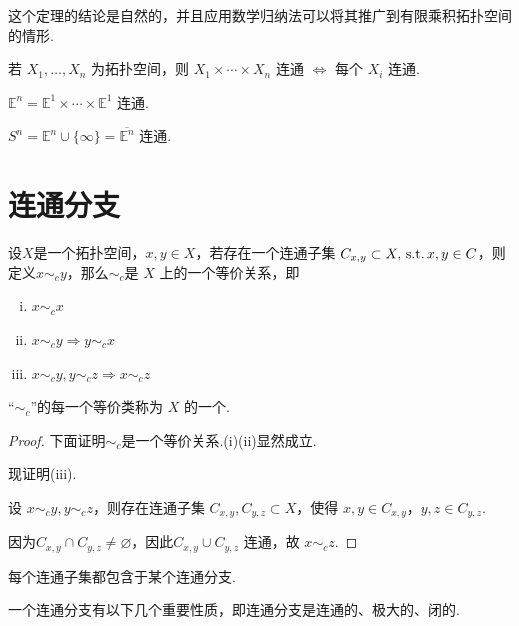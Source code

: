 这个定理的结论是自然的，并且应用数学归纳法可以将其推广到有限乘积拓扑空间的情形.

\begin{corollary}[有限乘积空间的连通性][cor:7.1]
    若 $X_1,\dots,X_n$ 为拓扑空间，则 $X_1\times\cdots\times X_n$ 连通 $\iff$ 每个 $X_i$ 连通.
\end{corollary}
\begin{instance}
    $\mathbb{E}^n=\mathbb{E}^1\times\cdots\times\mathbb{E}^1$ 连通.
\end{instance}
\begin{instance}
    $S^n=\mathbb{E}^n\cup\{\infty\}=\overline{\mathbb{E}^n}$ 连通.
\end{instance}
\section{连通分支}

\begin{definition}[连通分支][def:7.3]
    设$X$是一个拓扑空间，$x,y\in X$，若存在一个连通子集 $C_{x,y}\subset X,\operatorname{\,\text{s.t.}} x,y\in C$，则定义$x\sim_c y$，那么$\sim_c$是 $X$ 上的一个等价关系，即
    \begin{enumerate}[(i)]
        \item $x\sim_c x$
        \item $x\sim_c y\Rightarrow y\sim_c x$
        \item $x\sim_c y,y\sim_c z\Rightarrow x\sim_c z$
    \end{enumerate}
    “$\sim_c$”的每一个等价类称为 $X$ 的一个.
\end{definition}
\begin{proof}
    下面证明$\sim_c$是一个等价关系.(i)(ii)显然成立.\par
    现证明(iii).\par
    设 $x\sim_c y,y\sim_c z$，则存在连通子集 $C_{x,y},C_{y,z}\subset X$，使得 $x,y\in C_{x,y}$，$y,z\in C_{y,z}$.\par
    因为$C_{x,y}\cap C_{y,z}\neq\varnothing$，因此$C_{x,y}\cup C_{y,z}$ 连通，故 $x\sim_c z$.
\end{proof}

    


\begin{remark}
    每个连通子集都包含于某个连通分支.
\end{remark}

一个连通分支有以下几个重要性质，即连通分支是连通的、极大的、闭的.\par

